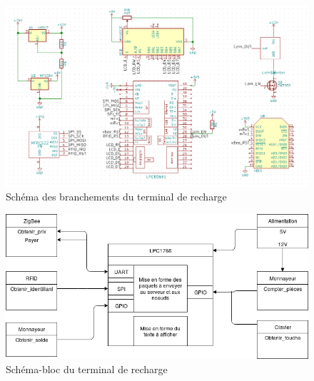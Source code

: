 	\begin{figure}[p]
		\includegraphics[width=\textwidth]{Pictures/Branchements/Terminal_Recharge}
		\caption{Schéma des branchements du terminal de recharge}
		\label{fig.branchRecharge}
	\end{figure}

	\begin{figure}[p]
		\includegraphics[width=\textwidth]{Pictures/Branchements/Recharge_Bloc}
		\caption{Schéma-bloc du terminal de recharge}
		\label{fig.blocRecharge}
	\end{figure}

	
	